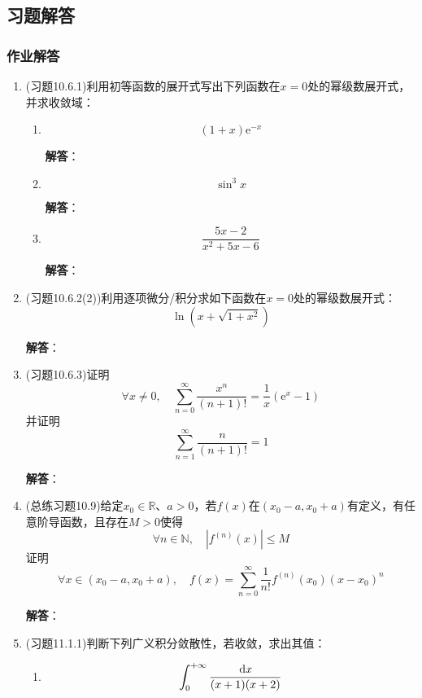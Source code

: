 \documentclass[a4paper,UTF8,fontset=windows,AutoFakeBold]{ctexart}
\newcommand*{\dr}{\hspace{0.07em}\mathrm{d}}
\newcommand*{\er}{\mathrm{e}}
\newcommand*{\rb}{\mathbb{R}}
\newcommand*{\suminf}[1][n=1]{\sum_{#1}^\infty}
\theoremstyle{ex}
\newcommand{\sol}[1]{{\vspace{5pt}\kaishu\noindent\textbf{解答}：\vspace{-3pt}
\begin{compactitem}
    \item[] #1
\end{compactitem}
}}
\begin{document}
\subsection{习题解答}
\subsubsection{作业解答}
\begin{enumerate}
    \item (习题10.6.1)利用初等函数的展开式写出下列函数在$x=0$处的幂级数展开式，并求收敛域：
    \begin{enumerate}
        \item[(5)] $$(1+x)\er^{-x}$$
        
        \sol{

        }

        \item[(7)] $$\sin^3x$$
        
        \sol{

        }

        \item[(10)] $$\frac{5x-2}{x^2+5x-6}$$
        
        \sol{

        }
    \end{enumerate}

    \item (习题10.6.2(2))利用逐项微分/积分求如下函数在$x=0$处的幂级数展开式：
    $$\ln(x+\sqrt{1+x^2})$$

    \sol{

    }
    
    \item (习题10.6.3)证明
    $$\forall x\ne0,\quad\suminf[n=0]\frac{x^n}{(n+1)!}=\frac{1}{x}(\er^x-1)$$
    并证明
    $$\suminf\frac{n}{(n+1)!}=1$$

    \sol{

    }
    
    \item (总练习题10.9)给定$x_0\in\rb$、$a>0$，若$f(x)$在$(x_0-a,x_0+a)$有定义，有任意阶导函数，且存在$M>0$使得
    $$\forall n\in\mathbb{N},\quad |f^{(n)}(x)|\le M$$
    证明
    $$\forall x\in(x_0-a,x_0+a),\quad f(x)=\suminf[n=0]\frac{1}{n!}f^{(n)}(x_0)(x-x_0)^n$$

    \sol{

    }
    
    \item (习题11.1.1)判断下列广义积分敛散性，若收敛，求出其值：
    \begin{enumerate}
        \item[(2)] $$\int_0^{+\infty}\frac{\dr x}{(x+1)(x+2)}$$
        

\end{enumerate}
\end{enumerate}
\end{document}
